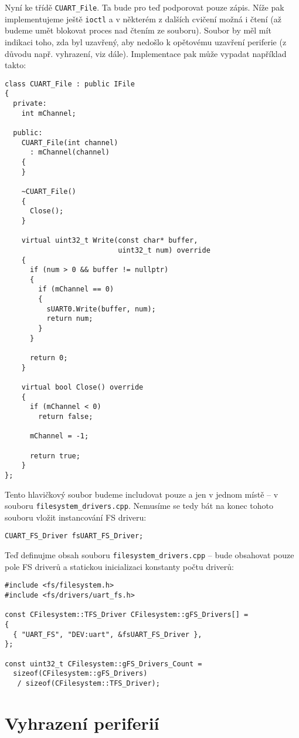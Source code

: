 \documentclass{article}
\begin{document}
Nyní ke třídě \texttt{CUART\_File}. Ta bude pro teď podporovat pouze zápis. Níže pak implementujeme ještě \texttt{ioctl} a v některém z dalších cvičení možná i čtení (až budeme umět blokovat proces nad čtením ze souboru). Soubor by měl mít indikaci toho, zda byl uzavřený, aby nedošlo k opětovému uzavření periferie (z důvodu např. vyhrazení, viz dále). Implementace pak může vypadat například takto:
\begin{lstlisting}
class CUART_File : public IFile
{
  private:
    int mChannel;

  public:
    CUART_File(int channel)
      : mChannel(channel)
    {
    }

    ~CUART_File()
    {
      Close();
    }

    virtual uint32_t Write(const char* buffer,
                           uint32_t num) override
    {
      if (num > 0 && buffer != nullptr)
      {
        if (mChannel == 0)
        {
          sUART0.Write(buffer, num);
          return num;
        }
      }
		
      return 0;
    }

    virtual bool Close() override
    {
      if (mChannel < 0)
        return false;

      mChannel = -1;

      return true;
    }
};
\end{lstlisting}
Tento hlavičkový soubor budeme includovat pouze a jen v jednom místě -- v souboru \texttt{filesystem\_drivers.cpp}. Nemusíme se tedy bát na konec tohoto souboru vložit instancování FS driveru:
\begin{lstlisting}
CUART_FS_Driver fsUART_FS_Driver;
\end{lstlisting}
Teď definujme obsah souboru \texttt{filesystem\_drivers.cpp} -- bude obsahovat pouze pole FS driverů a statickou inicializaci konstanty počtu driverů:
\begin{lstlisting}
#include <fs/filesystem.h>
#include <fs/drivers/uart_fs.h>

const CFilesystem::TFS_Driver CFilesystem::gFS_Drivers[] =
{
  { "UART_FS", "DEV:uart", &fsUART_FS_Driver },
};

const uint32_t CFilesystem::gFS_Drivers_Count =
  sizeof(CFilesystem::gFS_Drivers)
   / sizeof(CFilesystem::TFS_Driver);
\end{lstlisting}

\section{Vyhrazení periferií}
\end{document}
